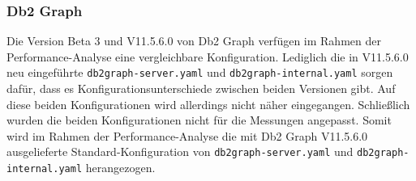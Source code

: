 \subsubsection{Db2 Graph}
Die Version Beta 3 und V11.5.6.0 von Db2 Graph verfügen im Rahmen der Performance-Analyse eine vergleichbare Konfiguration. Lediglich die in V11.5.6.0 neu eingeführte \texttt{db2graph-server.yaml} und \texttt{db2graph-internal.yaml} sorgen dafür, dass es Konfigurationsunterschiede zwischen beiden Versionen gibt. Auf diese beiden Konfigurationen wird allerdings nicht näher eingegangen. Schließlich wurden die beiden Konfigurationen nicht für die Messungen angepasst. Somit wird im Rahmen der Performance-Analyse die mit Db2 Graph V11.5.6.0 ausgelieferte Standard-Konfiguration von \texttt{db2graph-server.yaml} und \texttt{db2graph-internal.yaml} her\-angezogen.

